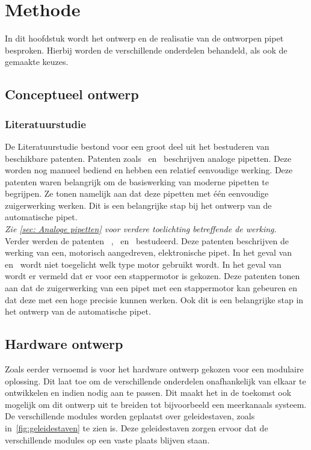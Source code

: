 \chapter{Methode}
In dit hoofdstuk wordt het ontwerp en de realisatie van de ontworpen pipet besproken. Hierbij worden de verschillende onderdelen behandeld, als ook de gemaakte keuzes.
\section{Conceptueel ontwerp}
\subsection{Literatuurstudie}
De Literatuurstudie bestond voor een groot deel uit het bestuderen van beschikbare patenten. Patenten zoals\ \cite{RN16} en\ \cite{RN17} beschrijven analoge pipetten. Deze worden nog manueel bediend en hebben een relatief eenvoudige werking. Deze patenten waren belangrijk om de basiswerking van moderne pipetten te begrijpen. Ze tonen namelijk aan dat deze pipetten met één eenvoudige zuigerwerking werken. Dit is een belangrijke stap bij het ontwerp van de automatische pipet.
\\\textit{Zie \autoref{sec: Analoge pipetten} voor verdere toelichting betreffende de werking.}
\\[12pt]Verder werden de patenten \ \cite{RN35},\ \cite{RN36} en\ \cite{RN38} bestudeerd. Deze patenten beschrijven de werking van een, motorisch aangedreven, elektronische pipet. In het geval van\ \cite{RN36} en\ \cite{RN38} wordt niet toegelicht welk type motor gebruikt wordt. In het geval van\ \cite{RN35} wordt er vermeld dat er voor een stappermotor is gekozen. Deze patenten tonen aan dat de zuigerwerking van een pipet met een stappermotor kan gebeuren en dat deze met een hoge precisie kunnen werken. Ook dit is een belangrijke stap in het ontwerp van de automatische pipet.
\section{Hardware ontwerp}
Zoals eerder vernoemd is voor het hardware ontwerp gekozen voor een modulaire oplossing. Dit laat toe om de verschillende onderdelen onafhankelijk van elkaar te ontwikkelen en indien nodig aan te passen. Dit maakt het in de toekomst ook mogelijk om dit ontwerp uit te breiden tot bijvoorbeeld een meerkanaals systeem.
\\[12pt]De verschillende modules worden geplaatst over geleidestaven, zoals in\ \autoref{fig:geleidestaven} te zien is. Deze geleidestaven zorgen ervoor dat de verschillende modules op een vaste plaats blijven staan. 

